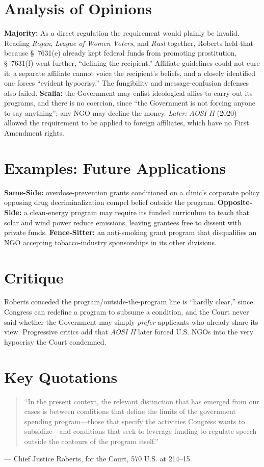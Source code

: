 \documentclass[12pt]{article}
\begin{document}
\section{Analysis of Opinions}
\textbf{Majority:} As a direct regulation the requirement would plainly be invalid. Reading \textit{Regan}, \textit{League of Women Voters}, and \textit{Rust} together, Roberts held that because \S~7631(e) already kept federal funds from promoting prostitution, \S~7631(f) went further, ``defining the recipient.'' Affiliate guidelines could not cure it: a separate affiliate cannot voice the recipient's beliefs, and a closely identified one forces ``evident hypocrisy.'' The fungibility and message-confusion defenses also failed. \textbf{Scalia:} the Government may enlist ideological allies to carry out its programs, and there is no coercion, since ``the Government is not forcing anyone to say anything''; any NGO may decline the money. \emph{Later:} \textit{AOSI II} (2020) allowed the requirement to be applied to foreign affiliates, which have no First Amendment rights.

\section{Examples: Future Applications}
\textbf{Same-Side:} overdose-prevention grants conditioned on a clinic's corporate policy opposing drug decriminalization compel belief outside the program. \textbf{Opposite-Side:} a clean-energy program may require its funded curriculum to teach that solar and wind power reduce emissions, leaving grantees free to dissent with private funds. \textbf{Fence-Sitter:} an anti-smoking grant program that disqualifies an NGO accepting tobacco-industry sponsorships in its other divisions.

\section{Critique}
Roberts conceded the program/outside-the-program line is ``hardly clear,'' since Congress can redefine a program to subsume a condition, and the Court never said whether the Government may simply \emph{prefer} applicants who already share its view. Progressive critics add that \textit{AOSI II} later forced U.S. NGOs into the very hypocrisy the Court condemned.

\section{Key Quotations}
\begin{quote}
``In the present context, the relevant distinction that has emerged from our cases is between conditions that define the limits of the government spending program---those that specify the activities Congress wants to subsidize---and conditions that seek to leverage funding to regulate speech outside the contours of the program itself.''
\end{quote}
\noindent --- Chief Justice Roberts, for the Court, 570 U.S. at 214--15.
\end{document}
